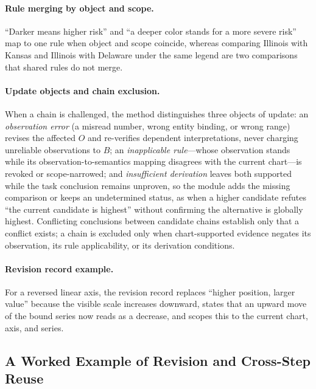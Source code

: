 \paragraph{Rule merging by object and scope.}
``Darker means higher risk'' and ``a deeper color stands
for a more severe risk'' map to one rule when object and
scope coincide, whereas comparing Illinois with Kansas
and Illinois with Delaware under the same legend are two
comparisons that shared rules do not merge.

\paragraph{Update objects and chain exclusion.}
When a chain is challenged, the method distinguishes
three objects of update: an \emph{observation error} (a
misread number, wrong entity binding, or wrong range)
revises the affected $O$ and re-verifies dependent
interpretations, never charging unreliable observations
to $B$; an \emph{inapplicable rule}---whose observation
stands while its observation-to-semantics mapping
disagrees with the current chart---is revoked or
scope-narrowed; and \emph{insufficient derivation}
leaves both supported while the task conclusion remains
unproven, so the module adds the missing comparison or
keeps an undetermined status, as when a higher candidate
refutes ``the current candidate is highest'' without
confirming the alternative is globally highest.
Conflicting conclusions between candidate chains
establish only that a conflict exists; a chain is
excluded only when chart-supported evidence negates its
observation, its rule applicability, or its derivation
conditions.

\paragraph{Revision record example.}
For a reversed linear axis, the revision record
replaces ``higher position, larger value'' because the
visible scale increases downward, states that an upward
move of the bound series now reads as a decrease, and
scopes this to the current chart, axis, and series.

\subsection{A Worked Example of Revision and Cross-Step Reuse}\label{app:example}

